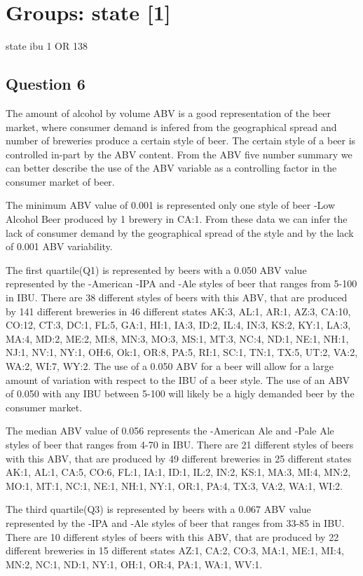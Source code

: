 \documentclass[]{article}
\begin{document}
\section{Groups: state {[}1{]}}\label{groups-state-1-1}

state ibu 1 OR 138

\subsection{Question 6}\label{question-6}

The amount of alcohol by volume ABV is a good representation of the beer
market, where consumer demand is infered from the geographical spread
and number of breweries produce a certain style of beer. The certain
style of a beer is controlled in-part by the ABV content. From the ABV
five number summary we can better describe the use of the ABV variable
as a controlling factor in the consumer market of beer.

The minimum ABV value of 0.001 is represented only one style of beer
-Low Alcohol Beer produced by 1 brewery in CA:1. From these data we can
infer the lack of consumer demand by the geographical spread of the
style and by the lack of 0.001 ABV variability.

The first quartile(Q1) is represented by beers with a 0.050 ABV value
represented by the -American -IPA and -Ale styles of beer that ranges
from 5-100 in IBU. There are 38 different styles of beers with this ABV,
that are produced by 141 different breweries in 46 different states
AK:3, AL:1, AR:1, AZ:3, CA:10, CO:12, CT:3, DC:1, FL:5, GA:1, HI:1,
IA:3, ID:2, IL:4, IN:3, KS:2, KY:1, LA:3, MA:4, MD:2, ME:2, MI:8, MN:3,
MO:3, MS:1, MT:3, NC:4, ND:1, NE:1, NH:1, NJ:1, NV:1, NY:1, OH:6, Ok:1,
OR:8, PA:5, RI:1, SC:1, TN:1, TX:5, UT:2, VA:2, WA:2, WI:7, WY:2. The
use of a 0.050 ABV for a beer will allow for a large amount of variation
with respect to the IBU of a beer style. The use of an ABV of 0.050 with
any IBU between 5-100 will likely be a higly demanded beer by the
consumer market.

The median ABV value of 0.056 represents the -American Ale and -Pale Ale
styles of beer that ranges from 4-70 in IBU. There are 21 different
styles of beers with this ABV, that are produced by 49 different
breweries in 25 different states AK:1, AL:1, CA:5, CO:6, FL:1, IA:1,
ID:1, IL:2, IN:2, KS:1, MA:3, MI:4, MN:2, MO:1, MT:1, NC:1, NE:1, NH:1,
NY:1, OR:1, PA:4, TX:3, VA:2, WA:1, WI:2.

The third quartile(Q3) is represented by beers with a 0.067 ABV value
represented by the -IPA and -Ale styles of beer that ranges from 33-85
in IBU. There are 10 different styles of beers with this ABV, that are
produced by 22 different breweries in 15 different states AZ:1, CA:2,
CO:3, MA:1, ME:1, MI:4, MN:2, NC:1, ND:1, NY:1, OH:1, OR:4, PA:1, WA:1,
WV:1.
\end{document}
